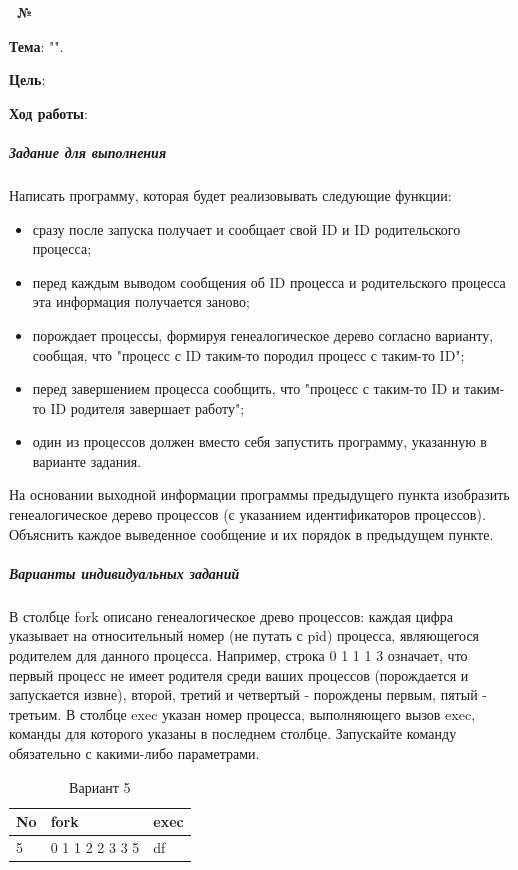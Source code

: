 \begin{center}
    \textbf{\titlePageTypeWork~№\titlePageNumberWork}
\end{center}

\textbf{Тема}: "\titlePageTopic".

\textbf{Цель}: 

\begin{center}
    \textbf{Ход работы}:
\end{center}

\subparagraph{Задание для выполнения}
Написать программу, которая будет реализовывать следующие функции:
\begin{itemize}
\item сразу после запуска получает и сообщает свой ID и ID родительского процесса;
\item перед каждым выводом сообщения об ID процесса и родительского процесса эта информация получается заново;
\item порождает процессы, формируя генеалогическое дерево согласно варианту, сообщая, что "процесс с ID таким-то породил процесс с таким-то ID";
\item перед завершением процесса сообщить, что "процесс с таким-то ID и таким-то ID родителя завершает работу";
\item один из процессов должен вместо себя запустить программу, указанную в варианте задания.
\end{itemize}

На основании выходной информации программы предыдущего пункта изобразить генеалогическое дерево процессов (с указанием идентификаторов процессов).
Объяснить каждое выведенное сообщение и их порядок в предыдущем пункте.

\subparagraph{Варианты индивидуальных заданий}
В столбце fork описано генеалогическое древо процессов: каждая цифра указывает на относительный номер (не путать с pid) процесса, являющегося родителем для данного процесса. 
Например, строка 0 1 1 1 3 означает, что первый процесс не имеет родителя среди ваших процессов (порождается и запускается извне), второй, третий и четвертый - порождены первым, пятый - третьим.
В столбце exec указан номер процесса, выполняющего вызов exec, команды для которого указаны в последнем столбце.
Запускайте команду обязательно с какими-либо параметрами.

\begin{table}[!htp]
    \centering
    \caption{Вариант 5}
    \begin{tabular}{|l|l|l|}
        \hline
        No  & fork              & exec  \\  \hline
        \hline
        5   & 0 1 1 2 2 3 3 5   & df    \\  \hline
    \end{tabular}
\end{table}

